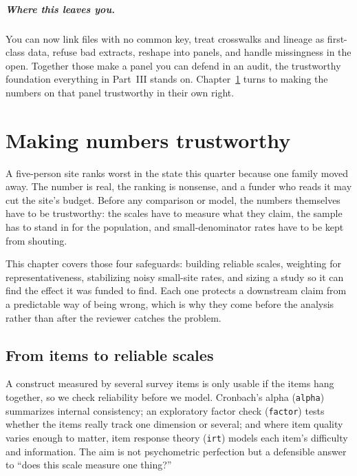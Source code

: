 \documentclass[
    a4paper,
    fontsize=10pt,
    twoside=true,
    numbers=noenddot,
]{kaobook}
\begin{document}
\paragraph{Where this leaves you.} You can now link files with no common key, treat crosswalks and lineage as first-class data, refuse bad extracts, reshape into panels, and handle missingness in the open. Together those make a panel you can defend in an audit, the trustworthy foundation everything in Part~III stands on. Chapter~\ref{ch:trust} turns to making the numbers on that panel trustworthy in their own right.



\chapter{Making numbers trustworthy}\label{ch:trust}

A five-person site ranks worst in the state this quarter because one family moved away. The number is real, the ranking is nonsense, and a funder who reads it may cut the site's budget. Before any comparison or model, the numbers themselves have to be trustworthy: the scales have to measure what they claim, the sample has to stand in for the population, and small-denominator rates have to be kept from shouting.

This chapter covers those four safeguards: building reliable scales, weighting for representativeness, stabilizing noisy small-site rates, and sizing a study so it can find the effect it was funded to find. Each one protects a downstream claim from a predictable way of being wrong, which is why they come before the analysis rather than after the reviewer catches the problem.

\section{From items to reliable scales}
A construct measured by several survey items is only usable if the items hang together, so we check reliability before we model. Cronbach's alpha (\texttt{alpha}) summarizes internal consistency; an exploratory factor check (\texttt{factor}) tests whether the items really track one dimension or several; and where item quality varies enough to matter, item response theory (\texttt{irt}) models each item's difficulty and information. The aim is not psychometric perfection but a defensible answer to \enquote{does this scale measure one thing?}
\end{document}
